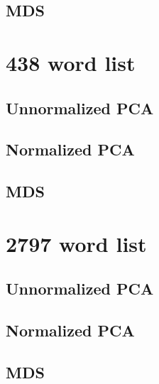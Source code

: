 \documentclass[eric_thesis.tex]{subfiles}
\begin{document}
\subsection{MDS}
\label{app:rankedwordlists:101words:mds}


\section{438 word list}
\subsection{Unnormalized PCA}
\label{app:rankedwordlists:438words:unnormalized}

\subsection{Normalized PCA}
\label{app:rankedwordlists:438words:normalized}

\subsection{MDS}
\label{app:rankedwordlists:438words:mds}


\section{2797 word list}
\subsection{Unnormalized PCA}
\label{app:rankedwordlists:2797words:unnormalized}

\subsection{Normalized PCA}
\label{app:rankedwordlists:2797words:normalized}

\subsection{MDS}
\label{app:rankedwordlists:2797words:mds}

\end{document}
